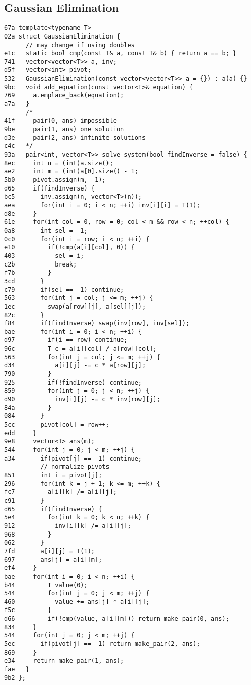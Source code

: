 \documentclass[10pt, a4paper, twoside]{article}
\begin{document}
\subsection{Gaussian Elimination}
\begin{lstlisting}
67a template<typename T>
02a struct GaussianElimination {
      // may change if using doubles
e1c   static bool cmp(const T& a, const T& b) { return a == b; }
741   vector<vector<T>> a, inv;
d5f   vector<int> pivot;
532   GaussianElimination(const vector<vector<T>> a = {}) : a(a) {}
9bc   void add_equation(const vector<T>& equation) {
769     a.emplace_back(equation);
a7a   }
      /*
41f     pair(0, ans) impossible
9be     pair(1, ans) one solution
d3e     pair(2, ans) infinite solutions
c4c   */
93a   pair<int, vector<T>> solve_system(bool findInverse = false) {
8ec     int n = (int)a.size();
ae2     int m = (int)a[0].size() - 1;
5b0     pivot.assign(m, -1);
d65     if(findInverse) {
bc5       inv.assign(n, vector<T>(n));
aea       for(int i = 0; i < n; ++i) inv[i][i] = T(1);
d8e     }
61e     for(int col = 0, row = 0; col < m && row < n; ++col) {
0a8       int sel = -1;
0c0       for(int i = row; i < n; ++i) {
e10         if(!cmp(a[i][col], 0)) {
403           sel = i;
c2b           break;
f7b         }
3cd       }
c79       if(sel == -1) continue;
563       for(int j = col; j <= m; ++j) {
1ec         swap(a[row][j], a[sel][j]);
82c       }
f84       if(findInverse) swap(inv[row], inv[sel]);
bae       for(int i = 0; i < n; ++i) {
d97         if(i == row) continue;
96c         T c = a[i][col] / a[row][col];
563         for(int j = col; j <= m; ++j) {
d34           a[i][j] -= c * a[row][j];
790         }
925         if(!findInverse) continue;
859         for(int j = 0; j < n; ++j) {
d90           inv[i][j] -= c * inv[row][j];
84a         }
084       }
5cc       pivot[col] = row++; 
edd     }
9e8     vector<T> ans(m);
544     for(int j = 0; j < m; ++j) {
a34       if(pivot[j] == -1) continue;
          // normalize pivots
851       int i = pivot[j];
296       for(int k = j + 1; k <= m; ++k) {
fc7         a[i][k] /= a[i][j];
c91       }
d65       if(findInverse) {
5e4         for(int k = 0; k < n; ++k) {
912           inv[i][k] /= a[i][j];
968         }
062       }
7fd       a[i][j] = T(1);
697       ans[j] = a[i][m];
ef4     }
bae     for(int i = 0; i < n; ++i) {
b44         T value(0);
544         for(int j = 0; j < m; ++j) {
460           value += ans[j] * a[i][j];
f5c         }
d66         if(!cmp(value, a[i][m])) return make_pair(0, ans);
834     }
544     for(int j = 0; j < m; ++j) {
5ec       if(pivot[j] == -1) return make_pair(2, ans);
869     }
e34     return make_pair(1, ans);
fae   }
9b2 };
\end{lstlisting}
\end{document}
